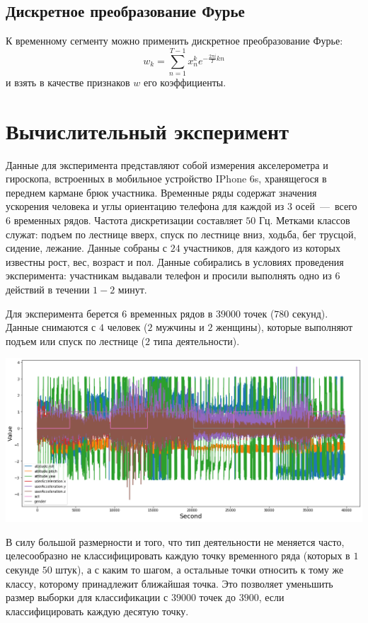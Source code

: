 \documentclass[12pt, twoside]{article}
\begin{document}
\subsection{ Дискретное преобразование Фурье}
К временному сегменту можно применить дискретное преобразование Фурье:
$$w_k = \sum\limits_{n=1}^{T-1}x_n^ke^{-\frac{2\pi i}{T}kn}$$
и взять в качестве признаков $w$ его коэффициенты.


\section{Вычислительный эксперимент}

Данные для эксперимента представляют собой измерения акселерометра и гироскопа, встроенных в мобильное устройство IPhone 6s, хранящегося в переднем кармане брюк участника. Временные ряды содержат значения ускорения человека и углы ориентацию телефона для каждой из $3$ осей~---~всего $6$ временных рядов. Частота дискретизации составляет $50$ Гц. Метками классов служат: подъем по лестнице вверх, спуск по лестнице вниз, ходьба, бег трусцой, сидение, лежание. Данные собраны с $24$ участников, для каждого из  которых известны рост, вес, возраст и пол. Данные собирались в условиях проведения эксперимента: участникам выдавали телефон и просили выполнять одно из $6$ действий в течении $1-2$ минут.

Для эксперимента берется $6$ временных рядов в $39000$ точек ($780$ секунд). Данные снимаются с $4$ человек ($2$ мужчины и $2$ женщины), которые выполняют подъем или спуск по лестнице ($2$ типа деятельности).

\includegraphics{data}

В силу большой размерности и того, что тип деятельности не меняется часто, целесообразно не классифицировать каждую точку временного ряда (которых в $1$ секунде $50$ штук), а с каким то шагом, а остальные точки относить к тому же классу, которому принадлежит ближайшая точка. Это позволяет уменьшить размер выборки для классификации с $39000$ точек до $3900$, если классифицировать каждую десятую точку.
\end{document}
